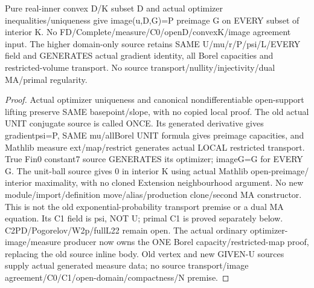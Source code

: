 \begin{lemma}
  \label{lem:compact-dual-capacity}
  \leanok
  Pure real-inner convex D/K subset D and actual optimizer
  inequalities/uniqueness give image(u,D,G)=P preimage G on EVERY subset of
  interior K. No FD/Complete/measure/C0/openD/convexK/image agreement input.
  The higher domain-only source retains SAME U/mu/r/P/psi/L/EVERY field and
  GENERATES actual gradient identity, all Borel capacities and restricted-volume
  transport. No source transport/nullity/injectivity/dual MA/primal regularity.
\end{lemma}
\begin{proof}
  \leanok
  Actual optimizer uniqueness and canonical nondifferentiable open-support
  lifting preserve SAME basepoint/slope, with no copied local proof. The old
  actual UNIT conjugate source is called ONCE. Its generated derivative gives
  gradientpsi=P, SAME mu/allBorel UNIT formula gives preimage capacities, and
  Mathlib measure ext/map/restrict generates actual LOCAL restricted transport.
  True Fin0 constant7 source GENERATES its optimizer; imageG=G for EVERY G.
  The unit-ball source gives 0 in interior K using actual Mathlib open-preimage/
  interior maximality, with no cloned Extension neighbourhood argument. No new
  module/import/definition move/alias/production clone/second MA constructor.
  This is not the old exponential-probability transport premise or a dual MA
  equation. Its C1 field is psi, NOT U; primal C1 is proved separately below.
  C2PD/Pogorelov/W2p/fullL22 remain open.
  The actual ordinary optimizer-image/measure producer now owns the ONE
  Borel capacity/restricted-map proof, replacing the old source inline body.
  Old vertex and new GIVEN-U sources supply actual generated measure data;
  no source transport/image agreement/C0/C1/open-domain/compactness/N premise.
\end{proof}


